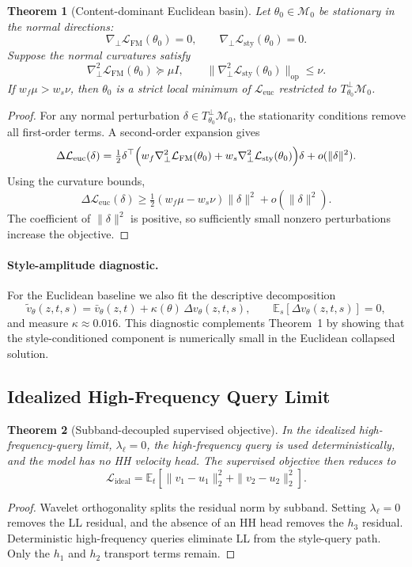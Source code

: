 \documentclass[10pt,letterpaper]{article}
\newtheorem*{stheorem}{Theorem}
\begin{document}
\begin{stheorem}[Content-dominant Euclidean basin]
Let $\theta_0\in\mathcal M_0$ be stationary in the normal directions:
\[
\nabla_\perp \mathcal L_{\mathrm{FM}}(\theta_0)=0,
\qquad
\nabla_\perp \mathcal L_{\mathrm{sty}}(\theta_0)=0.
\]
Suppose the normal curvatures satisfy
\[
\nabla_\perp^2 \mathcal L_{\mathrm{FM}}(\theta_0)\succeq \mu I,
\qquad
\|\nabla_\perp^2 \mathcal L_{\mathrm{sty}}(\theta_0)\|_{\mathrm{op}}\le\nu.
\]
If $w_f\mu>w_s\nu$, then $\theta_0$ is a strict local minimum of $\mathcal L_{\mathrm{euc}}$ restricted to $T_{\theta_0}^{\perp}\mathcal M_0$.
\end{stheorem}
\begin{proof}
For any normal perturbation $\delta\in T_{\theta_0}^{\perp}\mathcal M_0$, the stationarity conditions remove all first-order terms. A second-order expansion gives
\[
\Delta \mathcal L_{\mathrm{euc}}(\delta)
=
\tfrac12 \delta^\top
\Bigl(
w_f\nabla_\perp^2 \mathcal L_{\mathrm{FM}}(\theta_0)
+
w_s\nabla_\perp^2 \mathcal L_{\mathrm{sty}}(\theta_0)
\Bigr)\delta
+
o(\|\delta\|^2).
\]
Using the curvature bounds,
\[
\Delta \mathcal L_{\mathrm{euc}}(\delta)
\ge
\tfrac12(w_f\mu-w_s\nu)\|\delta\|^2 + o(\|\delta\|^2).
\]
The coefficient of $\|\delta\|^2$ is positive, so sufficiently small nonzero perturbations increase the objective.
\end{proof}

\paragraph{Style-amplitude diagnostic.}
For the Euclidean baseline we also fit the descriptive decomposition
\[
\tilde v_\theta(z,t,s)=\bar v_\theta(z,t)+\kappa(\theta)\,\Delta v_\theta(z,t,s),
\qquad
\mathbb E_s[\Delta v_\theta(z,t,s)] = 0,
\]
and measure $\kappa \approx 0.016$. This diagnostic complements Theorem~1 by showing that the style-conditioned component is numerically small in the Euclidean collapsed solution.

\subsection{Idealized High-Frequency Query Limit}
\label{sec:idealized}

\begin{stheorem}[Subband-decoupled supervised objective]
In the idealized high-frequency-query limit, $\lambda_\ell=0$, the high-frequency query is used deterministically, and the model has no HH velocity head. The supervised objective then reduces to
\[
\mathcal L_{\mathrm{ideal}}
=
\mathbb E_t\!\left[\|v_1-u_1\|_2^2 + \|v_2-u_2\|_2^2\right].
\]
\end{stheorem}
\begin{proof}
Wavelet orthogonality splits the residual norm by subband. Setting $\lambda_\ell=0$ removes the LL residual, and the absence of an HH head removes the $h_3$ residual. Deterministic high-frequency queries eliminate LL from the style-query path. Only the $h_1$ and $h_2$ transport terms remain.
\end{proof}
\end{document}

